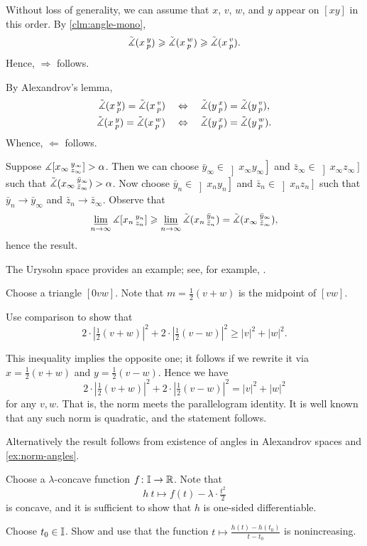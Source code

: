 Without loss of generality, we can assume that $x$, $v$, $w$, and $y$ appear on 
$[xy]$ in this order.
By \ref{clm:angle-mono},
\[
\tilde\measuredangle(x\,{}^{y}_{p})\geqslant \tilde\measuredangle(x\,{}^{w}_{p}) \geqslant\tilde\measuredangle(x\,{}^{v}_{p}).
\]
Hence, $\Rightarrow$ follows.

By Alexandrov's lemma,
\begin{align*}
\tilde\measuredangle(x\,{}^{y}_{p})=\tilde\measuredangle(x\,{}^{v}_{p})
\quad&\Leftrightarrow\quad
\tilde\measuredangle(y\,{}^{x}_{p})=\tilde\measuredangle(y\,{}^{v}_{p}),
\\
\tilde\measuredangle(x\,{}^{y}_{p})=\tilde\measuredangle(x\,{}^{w}_{p})
\quad&\Leftrightarrow\quad
\tilde\measuredangle(y\,{}^{x}_{p})=\tilde\measuredangle(y\,{}^{w}_{p}).
\end{align*}
Whence, $\Leftarrow$ follows.

 Suppose $\measuredangle [x_\infty\,{}^{y_\infty}_{z_\infty}]>\alpha$.
Then we can choose $\bar y_\infty\in\left]x_\infty y_\infty\right]$
and $\bar z_\infty\in\left]x_\infty z_\infty\right]$ such that 
$\tilde\measuredangle(x_\infty\,{}^{\bar y_\infty}_{\bar z_\infty})>\alpha$.
Now choose $\bar y_n\in\left]x_n y_n\right]$ and $\bar z_n\in\left]x_n z_n\right]$ such that $\bar y_n\to \bar y_\infty$ and $\bar z_n\to \bar z_\infty$.
Observe that 
\[\varliminf_{n\to\infty}\measuredangle [x_n\,{}^{y_n}_{z_n}]\geqslant\varliminf_{n\to\infty}\tilde\measuredangle(x_n\,{}^{\bar y_n}_{\bar z_n}) = \tilde\measuredangle(x_\infty\,{}^{\bar y_\infty}_{\bar z_\infty}),\]
hence the result.

The Urysohn space provides an example;
see, for example, \cite[Lecture 2]{petrunin2023pure}.

Choose a triangle $[0vw]$.
Note that $m=\tfrac12(v+w)$ is the midpoint of $[vw]$.

Use comparison to show that
\[2\cdot |\tfrac12(v+w)|^2+2\cdot |\tfrac12(v-w)|^2\ge |v|^2+|w|^2.\]

This inequality implies the opposite one;
it follows if we rewrite it via $x=\tfrac12(v+w)$ and $y=\tfrac12(v-w)$.
Hence we have 
\[2\cdot |\tfrac12(v+w)|^2+2\cdot |\tfrac12(v-w)|^2= |v|^2+|w|^2\]
for any $v,w$.
That is, the norm meets the parallelogram identity.
It is well known that any such norm is quadratic, and the statement follows.

 Alternatively the result follows from existence of angles in Alexandrov spaces and \ref{ex:norm-angles}.

Choose a $\lambda$-concave function $f\colon\mathbb{I}\to\mathbb{R}$.
Note that
\[h\:t\mapsto f(t)-\lambda\cdot\tfrac{t^2}2\]
is concave,
and it is sufficient to show that $h$ is one-sided differentiable.

Choose $t_0\in \mathbb{I}$.
Show and use that the function
$t\mapsto \tfrac {h(t)-h(t_0)}{t-t_0}$ is nonincreasing.

